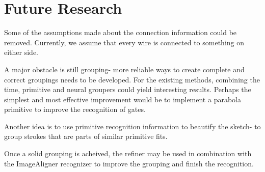\documentclass{article}
\begin{document}
\section{Future Research}
Some of the assumptions made about the connection information could be removed. Currently, we assume that every wire is connected to something on either side.

A major obstacle is still grouping- more reliable ways to create complete and correct groupings needs to be developed. For the existing methods, combining the time, primitive and neural groupers could yield interesting results. Perhaps the simplest and most effective improvement would be to implement a parabola primitive to improve the recognition of gates.

Another idea is to use primitive recognition information to beautify the sketch- to group strokes that are parts of similar primitive fits.

Once a solid grouping is acheived, the refiner may be used in combination with the ImageAligner recognizer to improve the grouping and finish the recognition.
\end{document}
